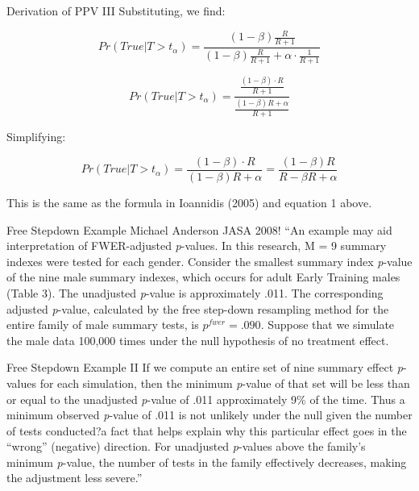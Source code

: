 \documentclass{beamer}
\begin{document}
\begin{frame}[label=derive]{Derivation of PPV III}
Substituting, we find:

\[Pr(True|T > t_{\alpha}) = \frac{(1 - \beta)\frac{R}{R + 1}}{(1 - \beta)\frac{R}{R + 1} + \alpha \cdot \frac{1}{R + 1}}\]

\[Pr(True|T > t_{\alpha}) = \frac{\frac{(1 - \beta) \cdot R}{R + 1}}{\frac{(1 - \beta)R + \alpha}{R + 1}}\]

Simplifying:

\[Pr(True|T > t_{\alpha}) = \frac{(1 - \beta) \cdot R}{(1 - \beta)R + \alpha} = \frac{(1 - \beta)R}{R - \beta R + \alpha}\]

This is the same as the formula in Ioannidis (2005) and equation 1
above.
\hyperlink{Ioannidis}{}
\end{frame}

\begin{frame}[label=FWERex]{Free Stepdown Example}
Michael Anderson JASA 2008! \href{https://are.berkeley.edu/~mlanderson/pdf/Anderson\%202008a.pdf}{}
\vskip0.2in
``An example may aid interpretation of FWER-adjusted \textit{p}-values.
In this research, M = 9 summary indexes were tested for
each gender. Consider the smallest summary index \textit{p}-value of
the nine male summary indexes, which occurs for adult Early
Training males (Table 3). The unadjusted \textit{p}-value is approximately
.011. The corresponding adjusted \textit{p}-value, calculated
by the free step-down resampling method for the entire family
of male summary tests, is $p^{fwer} = .090$. Suppose that we simulate
the male data 100,000 times under the null hypothesis of no
treatment effect. 
\end{frame}

\begin{frame}{Free Stepdown Example II}
If we compute an entire set of nine summary
effect \textit{p}-values for each simulation, then the minimum \textit{p}-value
of that set will be less than or equal to the unadjusted \textit{p}-value of
.011 approximately 9\% of the time. Thus a minimum observed
\textit{p}-value of .011 is not unlikely under the null given the number
of tests conducted?a fact that helps explain why this particular
effect goes in the ``wrong'' (negative) direction. For unadjusted \textit{p}-values above the family's minimum \textit{p}-value, the number of
tests in the family effectively decreases, making the adjustment
less severe.''

\hyperlink{FWERmain}{}
\end{frame}
\end{document}
